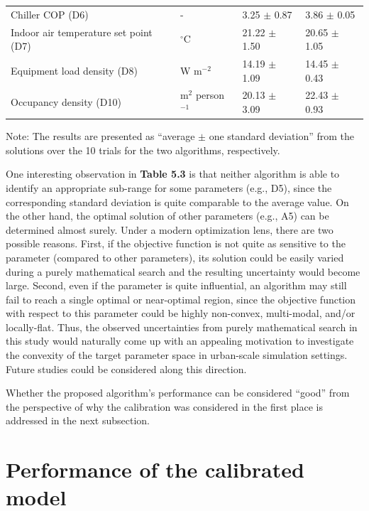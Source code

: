 \begin{table}[]
\begin{center}
{\begin{tabular}{llll}
Chiller COP (D6)                           & -           & 3.25 $\pm$ 0.87                & 3.86 $\pm$ 0.05                           \\
Indoor air temperature set point (D7)      & $^{\circ}$C          & 21.22 $\pm$ 1.50               & 20.65 $\pm$ 1.05                          \\
Equipment load density (D8)                & W m$^{-2}$       & 14.19 $\pm$ 1.09               & 14.45 $\pm$ 0.43                          \\
Occupancy density (D10)                    & m$^2$ person$^{-1}$ & 20.13 $\pm$ 3.09               & 22.43 $\pm$ 0.93                          \\
\bottomrule
\end{tabular}
}
\end{center}
Note: The results are presented as ``average $\pm$ one standard deviation'' from the solutions over the 10 trials for the two algorithms, respectively.
\end{table}

One interesting observation in \textbf{Table 5.3} is that neither algorithm is able to identify an appropriate sub-range for some parameters (e.g., D5), since the corresponding standard deviation is quite comparable to the average value. On the other hand, the optimal solution of other parameters (e.g., A5) can be determined almost surely. Under a modern optimization lens, there are two possible reasons. First, if the objective function is not quite as sensitive to the parameter (compared to other parameters), its solution could be easily varied during a purely mathematical search and the resulting uncertainty would become large. Second, even if the parameter is quite influential, an algorithm may still fail to reach a single optimal or near-optimal region, since the objective function with respect to this parameter could be highly non-convex, multi-modal, and/or locally-flat. Thus, the observed uncertainties from purely mathematical search in this study would naturally come up with an appealing motivation to investigate the convexity of the target parameter space in urban-scale simulation settings. Future studies could be considered along this direction.

Whether the proposed algorithm's performance can be considered ``good'' from the perspective of why the calibration was considered in the first place is addressed in the next subsection.

\section{Performance of the calibrated model}


